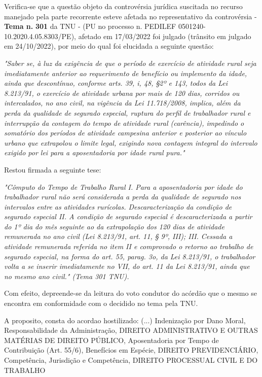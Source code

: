 \documentclass[12pt]{article}
\begin{document}
\justifying
\noindent Verifica-se que a questão objeto da controvérsia jurídica suscitada no recurso manejado pela parte recorrente esteve afetada no representativo da controvérsia - \textbf{Tema n. }\textbf{301} da TNU - (PU no processo n. PEDILEF 0501240-10.2020.4.05.8303/PE),  afetado em 17/03/2022 foi julgado (trânsito em julgado em 24/10/2022), por meio do qual foi elucidada a seguinte questão:

\noindent \textit{"Saber se, à luz da exigência de que o período de exercício de atividade rural seja imediatamente anterior ao requerimento de benefício ou implemento da idade, ainda que descontínuo, conforme arts. 39, i, 48, §2º e 143, todos da Lei 8.213/91, o exercício de atividade urbana por mais de 120 dias, corridos ou intercalados, no ano civil, na vigência da Lei 11.718/2008, implica, além da perda da qualidade de segurado especial, ruptura do perfil de trabalhador rural e interrupção da contagem do tempo de atividade rural (carência), impedindo o somatório dos períodos de atividade campesina anterior e posterior ao vínculo urbano que extrapolou o limite legal, exigindo nova contagem integral do intervalo exigido por lei para a aposentadoria por idade rural pura."}

\noindent Restou firmada a seguinte tese:

\noindent \textit{"Cômputo do Tempo de Trabalho Rural I. Para a aposentadoria por idade do trabalhador rural não será considerada a perda da qualidade de segurado nos intervalos entre as atividades rurícolas. Descaracterização da condição de segurado especial II. A condição de segurado especial é descaracterizada a partir do 1º dia do mês seguinte ao da extrapolação dos 120 dias de atividade remunerada no ano civil (Lei 8.213/91, art. 11, § 9º, III); III. Cessada a atividade remunerada referida no item II e comprovado o retorno ao trabalho de segurado especial, na forma do art. 55, parag. 3o, da Lei 8.213/91, o trabalhador volta a se inserir imediatamente no VII, do art. 11 da Lei 8.213/91, ainda que no mesmo ano civil." (Tema 301 TNU).}

\noindent Com efeito, depreende-se da leitura do voto condutor do acórdão que o mesmo se encontra em conformidade com o decidido no  tema pela TNU.

\noindent A proposito, consta do acordao hostilizado: (...) Indenização por Dano Moral, Responsabilidade da Administração, DIREITO ADMINISTRATIVO E OUTRAS MATÉRIAS DE DIREITO PÚBLICO, Aposentadoria por Tempo de Contribuição (Art. 55/6), Benefícios em Espécie, DIREITO PREVIDENCIÁRIO, Competência, Jurisdição e Competência, DIREITO PROCESSUAL CIVIL E DO TRABALHO
\end{document}
